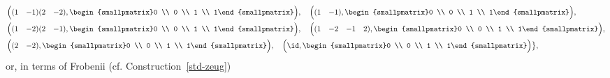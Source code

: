 \documentclass[a4paper]{scrartcl} %
\numberwithin{equation}{section}
\begin{document}
\begin{align*}
&\Bigl((1 \quad {-1})(2 \quad {-2})      , \begin{smallpmatrix}0 \\ 0 \\ 1 \\ 1\end{smallpmatrix}\Bigr), \quad
\Bigl((1 \quad {-1})                    , \begin{smallpmatrix}0 \\ 0 \\ 1 \\ 1\end{smallpmatrix}\Bigr), \\
  &\Bigl((1 \quad {-2})(2 \quad {-1})      , \begin{smallpmatrix}0 \\ 0 \\ 1 \\ 1\end{smallpmatrix}\Bigr), \quad
\Bigl((1 \quad {-2} \quad {-1} \quad 2) , \begin{smallpmatrix}0 \\ 0 \\ 1 \\ 1\end{smallpmatrix}\Bigr), \\
&\Bigl((2 \quad {-2})                    , \begin{smallpmatrix}0 \\ 0 \\ 1 \\ 1\end{smallpmatrix}\Bigr), \quad
  \Bigl(\id                               , \begin{smallpmatrix}0 \\ 0 \\ 1 \\ 1\end{smallpmatrix}\Bigr)
  \bigr\},
\end{align*}
or, in terms of Frobenii (cf. Construction~\ref{std-zeug})
\end{document}
